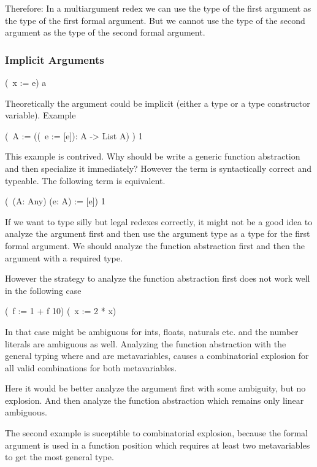 Therefore: In a multiargument redex we can use the type of the first argument as
the type of the first formal argument. But we cannot use the type of the second
argument as the type of the second formal argument.


\vskip 5mm
\subsubsection{Implicit Arguments}

\begin{alba}
    (\ x := e) a
\end{alba}

Theoretically the argument  could be implicit (either a type or a type
constructor variable). Example

\begin{alba}
    (\ A := ((\ e := [e]): A -> List A) ) 1
\end{alba}
%
This example is contrived. Why should be write a generic function abstraction
and then specialize it immediately? However the term is syntactically correct
and typeable. The following term is equivalent.

\begin{alba}
    (\ (A: Any) (e: A) := [e]) 1
\end{alba}

If we want to type silly but legal redexes correctly, it might not be a good
idea to analyze the argument first and then use the argument type as a type for
the first formal argument. We should analyze the function abstraction first and
then the argument with a required type.

However the strategy to analyze the function abstraction first does not work
well in the following case
%
\begin{alba}
    (\ f := 1 + f 10) (\ x := 2 * x)
\end{alba}
%
In that case \code{(+)} might be ambiguous for ints, floats, naturals etc. and
the number literals are ambiguous as well. Analyzing the function abstraction
with the general typing  where  and 
are metavariables, causes a combinatorial explosion for all valid combinations
for both metavariables.

Here it would be better analyze the argument first with some ambiguity, but no
explosion. And then analyze the function abstraction which remains only linear
ambiguous.

The second example is suceptible to combinatorial explosion, because the formal
argument  is used in a function position which requires at least two
metavariables to get the most general type.








